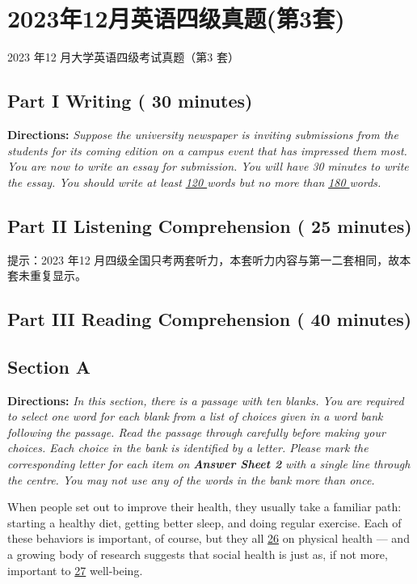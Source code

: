 \documentclass[UTF8,11pt]{ctexart}
\begin{document}
\section*{2023年12月英语四级真题(第3套)}
2023 年12 月大学英语四级考试真题（第3 套）


\subsection*{\textbf{Part I Writing} \textbf{( 30 minutes)}}


\textbf{Directions:} \textit{Suppose the university newspaper is inviting submissions from the students for its coming edition on a} \textit{campus event that has impressed them most. You are now to write an essay for submission. You will have 30} \textit{minutes to write the essay. You should write at least }\textit{\uline{120 }}\textit{words but no more than }\textit{\uline{180 }}\textit{words.}


\subsection*{\textbf{Part II} \textbf{Listening Comprehension} \textbf{( 25 minutes)}}


提示：2023 年12 月四级全国只考两套听力，本套听力内容与第一二套相同，故本套未重复显示。


\subsection*{\textbf{Part III Reading Comprehension ( 40 minutes)}}


\subsection*{\textbf{Section A}}


\textbf{Directions:} \textit{In this section, there is a passage with ten blanks. You are required to select one word for each blank} \textit{from a list of choices given in a word bank following the passage. Read the passage through carefully before} \textit{making your choices. Each choice in the bank is identified by a letter. Please mark the corresponding letter for} \textit{each item on }\textbf{\textit{Answer Sheet 2}}\textit{ with a single line through the centre. You may not use any of the words in the bank} \textit{more than once.}


When people set out to improve their health, they usually take a familiar path: starting a healthy diet, getting better sleep, and doing regular exercise. Each of these behaviors is important, of course, but they all \uline{26} on physical health — and a growing body of research suggests that social health is just as, if not more, important to \uline{27} well-being.
\end{document}
